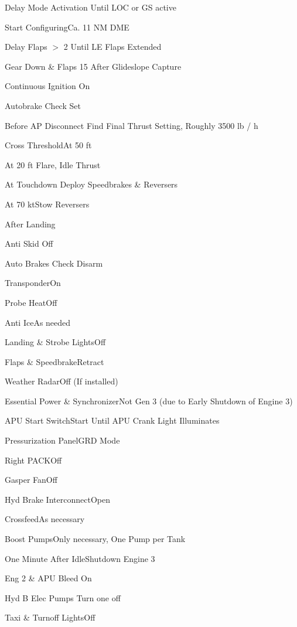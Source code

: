 \documentclass[sim-use]{checklist}
\begin{document}
\begin{continuedchecklist}
     {
        \item {Delay Mode Activation} {Until LOC or GS active}
    }
    \item{Start Configuring}{Ca. 11 NM DME}
    \item{Delay Flaps $>$ 2} {Until LE Flaps Extended}
    \item{Gear Down \& Flaps 15} {After Glideslope Capture}
     {
        \item{Continuous Ignition }{On}
    }
    \item{Autobrake} {Check Set}
    \item{Before AP Disconnect} {Find Final Thrust Setting, Roughly 3500 lb / h}
    \item{Cross Threshold}{At 50 ft}
    \item{At 20 ft} {Flare, Idle Thrust}
    \item{At Touchdown} {Deploy Speedbrakes \& Reversers}
    \item{At 70 kt}{Stow Reversers}
\end{continuedchecklist}

\begin{checklist}{After Landing}
	\item{Anti Skid} {Off}
	\item{Auto Brakes} {Check Disarm}
	\item{Transponder}{On}
	\item{Probe Heat}{Off}
	\item{Anti Ice}{As needed}
	\item{Landing \& Strobe Lights}{Off}
	\item{Flaps \& Speedbrake}{Retract}
	\item{Weather Radar}{Off (If installed)}
	\item{Essential Power \& Synchronizer}{Not Gen 3 (due to Early Shutdown of Engine 3)}
    \item{APU Start Switch}{Start Until APU Crank Light Illuminates}
    \item{Pressurization Panel}{GRD Mode}
    \item{Right PACK}{Off}
    \item{Gasper Fan}{Off}
    \item{Hyd Brake Interconnect}{Open}
    \item{Crossfeed}{As necessary}
    \item{Boost Pumps}{Only necessary, One Pump per Tank}
    \item{One Minute After Idle}{Shutdown Engine 3}
     {
		\item{Eng 2 \& APU Bleed} {On}
		\item{Hyd B Elec Pumps} {Turn one off}
    }
	 {
		\item{Taxi \& Turnoff Lights}{Off}
	}
\end{checklist}
\end{document}
